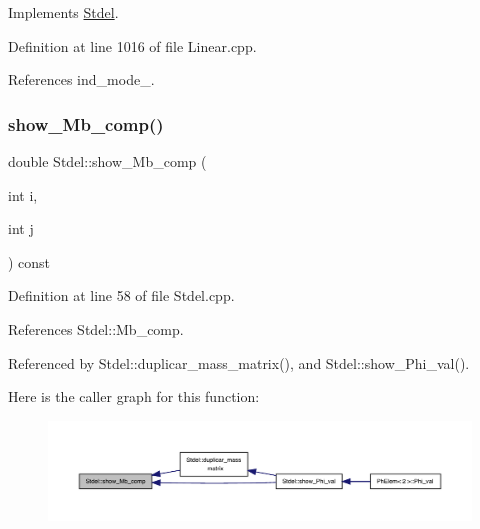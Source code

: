 Implements \hyperlink{classStdel_aa97cf7534697be1f2e02ff540ed7433b}{Stdel}.



Definition at line 1016 of file Linear.\+cpp.



References ind\+\_\+mode\+\_\+.

\mbox{\label{classStdel_a4860f0f650640f859c5f75c206ee1f60}} 
\subsubsection{\texorpdfstring{show\+\_\+\+Mb\+\_\+comp()}{show\_Mb\_comp()}}
{\footnotesize\ttfamily double Stdel\+::show\+\_\+\+Mb\+\_\+comp (\begin{DoxyParamCaption}\item[{int}]{i,  }\item[{int}]{j }\end{DoxyParamCaption}) const\hspace{0.3cm}{\ttfamily [inherited]}}



Definition at line 58 of file Stdel.\+cpp.



References Stdel\+::\+Mb\+\_\+comp.



Referenced by Stdel\+::duplicar\+\_\+mass\+\_\+matrix(), and Stdel\+::show\+\_\+\+Phi\+\_\+val().

Here is the caller graph for this function\+:
\nopagebreak
\begin{figure}[H]
\begin{center}
\leavevmode
\includegraphics[width=350pt]{classStdel_a4860f0f650640f859c5f75c206ee1f60_icgraph}
\end{center}
\end{figure}
\mbox{\label{classStdel_a44d5aa234e02fb41afd5a4e5e45fadc4}} 
